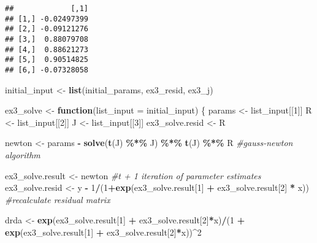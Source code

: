 \documentclass[
]{article}
\newenvironment{Shaded}{\begin{snugshade}}{\end{snugshade}}
\newcommand{\CommentTok}[1]{\textcolor[rgb]{0.56,0.35,0.01}{\textit{#1}}}
\newcommand{\ControlFlowTok}[1]{\textcolor[rgb]{0.13,0.29,0.53}{\textbf{#1}}}
\newcommand{\DataTypeTok}[1]{\textcolor[rgb]{0.13,0.29,0.53}{#1}}
\newcommand{\DecValTok}[1]{\textcolor[rgb]{0.00,0.00,0.81}{#1}}
\newcommand{\KeywordTok}[1]{\textcolor[rgb]{0.13,0.29,0.53}{\textbf{#1}}}
\newcommand{\NormalTok}[1]{#1}
\newcommand{\OperatorTok}[1]{\textcolor[rgb]{0.81,0.36,0.00}{\textbf{#1}}}
\newcommand{\StringTok}[1]{\textcolor[rgb]{0.31,0.60,0.02}{#1}}
\begin{document}
\begin{verbatim}
##             [,1]
## [1,] -0.02497399
## [2,] -0.09121276
## [3,]  0.88079708
## [4,]  0.88621273
## [5,]  0.90514825
## [6,] -0.07328058
\end{verbatim}

\begin{Shaded}
\begin{Highlighting}[]
\NormalTok{initial\_input \textless{}{-}}\StringTok{ }\KeywordTok{list}\NormalTok{(initial\_params, ex3\_resid, ex3\_j)}

\NormalTok{ex3\_solve \textless{}{-}}\StringTok{ }\ControlFlowTok{function}\NormalTok{(}\DataTypeTok{list\_input =}\NormalTok{ initial\_input) \{}
\NormalTok{  params \textless{}{-}}\StringTok{ }\NormalTok{list\_input[[}\DecValTok{1}\NormalTok{]]}
\NormalTok{  R \textless{}{-}}\StringTok{ }\NormalTok{list\_input[[}\DecValTok{2}\NormalTok{]]}
\NormalTok{  J \textless{}{-}}\StringTok{ }\NormalTok{list\_input[[}\DecValTok{3}\NormalTok{]]}
\NormalTok{  ex3\_solve.resid \textless{}{-}}\StringTok{ }\NormalTok{R}
  
\NormalTok{  newton \textless{}{-}}\StringTok{ }\NormalTok{params }\OperatorTok{{-}}\StringTok{ }\KeywordTok{solve}\NormalTok{(}\KeywordTok{t}\NormalTok{(J) }\OperatorTok{\%*\%}\StringTok{ }\NormalTok{J) }\OperatorTok{\%*\%}\StringTok{ }\KeywordTok{t}\NormalTok{(J) }\OperatorTok{\%*\%}\StringTok{ }\NormalTok{R }\CommentTok{\#gauss{-}newton algorithm}
  
\NormalTok{  ex3\_solve.result \textless{}{-}}\StringTok{ }\NormalTok{newton }\CommentTok{\#t + 1 iteration of parameter estimates}
\NormalTok{  ex3\_solve.resid \textless{}{-}}\StringTok{ }\NormalTok{y }\OperatorTok{{-}}\StringTok{ }\DecValTok{1}\OperatorTok{/}\NormalTok{(}\DecValTok{1}\OperatorTok{+}\KeywordTok{exp}\NormalTok{(ex3\_solve.result[}\DecValTok{1}\NormalTok{] }\OperatorTok{+}\StringTok{ }\NormalTok{ex3\_solve.result[}\DecValTok{2}\NormalTok{] }\OperatorTok{*}\StringTok{ }\NormalTok{x)) }\CommentTok{\#recalculate residual matrix}
  
\NormalTok{  drda \textless{}{-}}\StringTok{ }\KeywordTok{exp}\NormalTok{(ex3\_solve.result[}\DecValTok{1}\NormalTok{] }\OperatorTok{+}\StringTok{ }\NormalTok{ex3\_solve.result[}\DecValTok{2}\NormalTok{]}\OperatorTok{*}\NormalTok{x)}\OperatorTok{/}\NormalTok{(}\DecValTok{1} \OperatorTok{+}\StringTok{ }\KeywordTok{exp}\NormalTok{(ex3\_solve.result[}\DecValTok{1}\NormalTok{] }\OperatorTok{+}\StringTok{ }\NormalTok{ex3\_solve.result[}\DecValTok{2}\NormalTok{]}\OperatorTok{*}\NormalTok{x))}\OperatorTok{\^{}}\DecValTok{2}


\end{Highlighting}
\end{Shaded}
\end{document}
